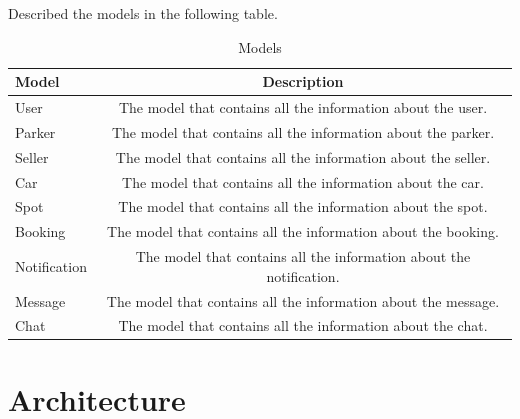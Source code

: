                     \pagebreak
                    \clearpage
                    
                    
                    Described the models in the following table.
                    \begin{table}[htb]
                        \centering
                        \begin{tabular}{ | l | c | }
                            \hline
                            Model & Description \\
                            \hline
                            \hline
                            User & The model that contains all the information about the user. \\
                            \hline
                            Parker & The model that contains all the information about the parker. \\
                            \hline
                            Seller & The model that contains all the information about the seller. \\
                            \hline
                            Car & The model that contains all the information about the car. \\
                            \hline
                            Spot & The model that contains all the information about the spot. \\
                            \hline
                            Booking & The model that contains all the information about the booking. \\
                            \hline
                            Notification & The model that contains all the information about the notification. \\
                            \hline
                            Message & The model that contains all the information about the message. \\
                            \hline
                            Chat & The model that contains all the information about the chat. \\
                            \hline
                        \end{tabular}
                        \caption{Models}
                        \label{tab:models}
                    \end{table}



                
        \pagebreak
        \section{Architecture}
